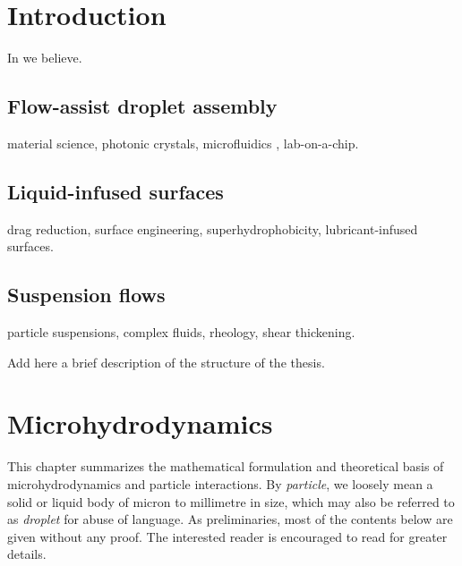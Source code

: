 \graphicspath{{imgs/}}

\chapter{Introduction}



In \cite{Batchelor} we believe.



\section{Flow-assist droplet assembly}

material science,
photonic crystals,
microfluidics \citep{Squires_Quakes_2005},
lab-on-a-chip.


\section{Liquid-infused surfaces}

drag reduction,
surface engineering,
superhydrophobicity,
lubricant-infused surfaces.


\section{Suspension flows}

particle suspensions,
complex fluids,
rheology,
shear thickening.

\thesisstructure Add here a brief description of the structure of the thesis.



\chapter{Microhydrodynamics}


This chapter summarizes the mathematical formulation and theoretical basis of microhydrodynamics and particle interactions.
By \emph{particle}, we loosely mean a solid or liquid body of micron to millimetre in size, which may also be referred to as \emph{droplet} for abuse of language.
As preliminaries, most of the contents below are given without any proof. The interested reader is encouraged to read \cite{Batchelor, hb, ps, kim_karrila, graham_2018} for greater details.

